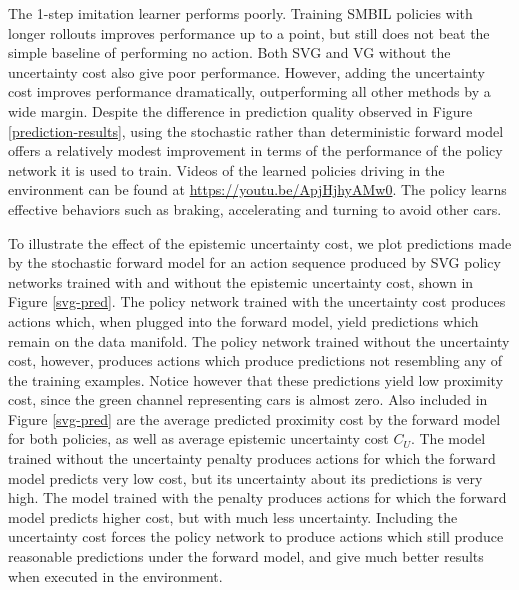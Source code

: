 \documentclass{article} %
\begin{document}
  The 1-step imitation learner performs poorly.
  Training SMBIL policies with longer rollouts improves performance up to a point, but still does not beat the simple baseline of performing no action.
  Both SVG and VG without the uncertainty cost also give poor performance.
  However, adding the uncertainty cost improves performance dramatically, outperforming all other methods by a wide margin.
  Despite the difference in prediction quality observed in Figure \ref{prediction-results}, using the stochastic rather than deterministic forward model offers a relatively modest improvement in terms of the performance of the policy network it is used to train.
  Videos of the learned policies driving in the environment can be found at \url{https://youtu.be/ApjHjhyAMw0}.
  The policy learns effective behaviors such as braking, accelerating and turning to avoid other cars.


  To illustrate the effect of the epistemic uncertainty cost, we plot predictions made by the stochastic forward model for an action sequence produced by SVG policy networks trained with and without the epistemic uncertainty cost, shown in Figure \ref{svg-pred}.
  The policy network trained with the uncertainty cost produces actions which, when plugged into the forward model, yield predictions which remain on the data manifold.
  The policy network trained without the uncertainty cost, however, produces actions which produce predictions not resembling any of the training examples.
  Notice however that these predictions yield low proximity cost, since the green channel representing cars is almost zero.
  Also included in Figure \ref{svg-pred} are the average predicted proximity cost by the forward model for both policies, as well as average epistemic uncertainty cost $C_U$.
  The model trained without the uncertainty penalty produces actions for which the forward model predicts very low cost, but its uncertainty about its predictions is very high.
  The model trained with the penalty produces actions for which the forward model predicts higher cost, but with much less uncertainty.
  Including the uncertainty cost forces the policy network to produce actions which still produce reasonable predictions under the forward model, and give much better results when executed in the environment.
\end{document}
